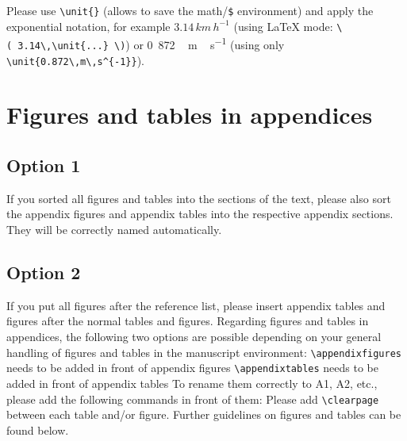 \documentclass[gchron, manuscript]{copernicus}
\begin{document}
Please use \texttt{\textbackslash{}unit\{\}} (allows to save the math/\texttt{\$} environment) and apply the exponential notation, for example \(3.14\,\unit{km\,h^{-1}}\) (using LaTeX mode: \texttt{\textbackslash{}(\ 3.14\textbackslash{},\textbackslash{}unit\{...\}\ \textbackslash{})}) or \unit{0.872\,m\,s^{-1}} (using only \texttt{\textbackslash{}unit\{0.872\textbackslash{},m\textbackslash{},s\^{}\{-1\}\}}).








\appendix
\section{Figures and tables in appendices}
\subsection{Option 1}

If you sorted all figures and tables into the sections of the text, please also sort the appendix figures and appendix tables into the respective appendix sections.
They will be correctly named automatically.

\subsection{Option 2}

If you put all figures after the reference list, please insert appendix tables and figures after the normal tables and figures.
Regarding figures and tables in appendices, the following two options are possible depending on your general handling of figures and tables in the manuscript environment:
\texttt{\textbackslash{}appendixfigures} needs to be added in front of appendix figures
\texttt{\textbackslash{}appendixtables} needs to be added in front of appendix tables
To rename them correctly to A1, A2, etc., please add the following commands in front of them:
Please add \texttt{\textbackslash{}clearpage} between each table and/or figure. Further guidelines on figures and tables can be found below.
\noappendix

\end{document}
